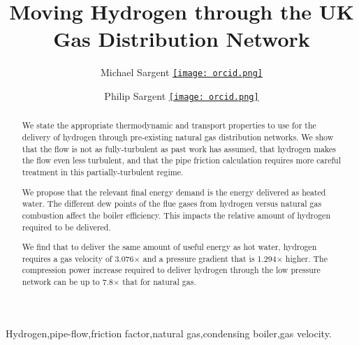 \documentclass[5p]{elsarticle} %
\newcommand{\orcid}[1]{\href{https://orcid.org/#1}{\texttt{[image: orcid.png]}}}
\begin{document}
\begin{frontmatter}

\makeatletter
\providecommand{\doi}[1]{%
  \begingroup
    \let\bibinfo\@secondoftwo
    \urlstyle{rm}%
    \href{http://dx.doi.org/#1}{%
      doi:\discretionary{}{}{}%
      \nolinkurl{#1}%
    }%
  \endgroup
}
\makeatother


\title{Moving Hydrogen through the UK Gas Distribution Network}


\author[mjs]{Michael Sargent  \orcid{0000-0001-9129-2990} }

\author[mjs]{Philip Sargent  \orcid{0000-0002-1825-0097}}


  \address[mjs]{Cambridge Energy UK, 27 Greville Road, Cambridge CB1 3QJ, UK }
 
  
\newcommand{\sshratio}{3.292} %
\newcommand{\ssvratio}{3.076} %
\newcommand{\sspratio}{1.294} %
\newcommand{\sseratio}{3.980}  %

\begin{abstract}

We state the appropriate thermodynamic and transport properties to use for the delivery of hydrogen through pre-existing natural gas distribution networks. We show that the flow is not as fully-turbulent as past work has assumed, that hydrogen makes the flow even less turbulent, and that the pipe friction calculation requires more careful treatment in this partially-turbulent regime.

We propose that the relevant final energy demand is the  energy delivered as heated water. The different dew points of the flue gases from hydrogen versus natural gas combustion affect the boiler efficiency. This impacts the relative amount of hydrogen required to be delivered.

We find that to deliver the same amount of useful energy as hot water, hydrogen requires a gas velocity of 3.076$\times$ and a pressure gradient that is \sspratio$\times$  higher. The compression power increase required to deliver hydrogen through the low pressure network can be up to 7.8$\times$  that for natural gas.

\end{abstract}

\begin{keyword}
Hydrogen\sep pipe-flow\sep  friction factor\sep  natural gas\sep condensing boiler\sep gas velocity.
\end{keyword}

\end{frontmatter}
\end{document}
